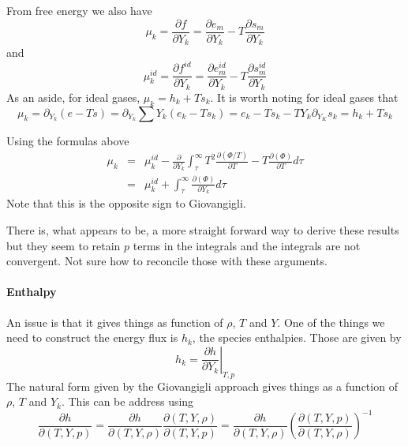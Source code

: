 \documentclass[11pt]{article}
\begin{document}
From free energy we also have
\[
\mu_k = \frac{\partial f}{\partial Y_k} = 
 \frac{\partial e_m}{\partial Y_k} - 
 T\frac{\partial s_m}{\partial Y_k} 
\]
and
\[
\mu_k^{id} = \frac{\partial f^{id}}{\partial Y_k} = 
 \frac{\partial e_m^{id}}{\partial Y_k} - 
 T\frac{\partial s_m^{id}}{\partial Y_k} 
\]
As an aside, for ideal gases, $\mu_k = h_k + T s_k$.  It is worth noting for ideal gases 
that
\[
\mu_k = \partial_{Y_k} (e - T s) = 
 \partial_{Y_k} \sum Y_k(e_k - T s_k) = e_k - T s_k - T Y_k \partial_{Y_K}s_k = h_k + T s_k
\]

Using the formulas above
\begin{eqnarray}
\mu_k &=& \mu_k^{id} - \frac{\partial}{\partial Y_k} \int_\tau^\infty
 T^2 \frac{\partial (\Phi/T)} {\partial T} - T \frac{\partial (\Phi)} {\partial T} d\tau \\
 &=& \mu_k^{id} + \int_\tau^\infty \frac{\partial (\Phi)} {\partial Y_k} d\tau
\end{eqnarray}
Note that this is the opposite sign to Giovangigli.

There is, what appears to be, a more straight forward way to derive these results
but they seem to retain $p$ terms in the integrals
and the integrals are not convergent. Not sure how to reconcile those with these arguments.

%
%
%
\paragraph{Enthalpy}
An issue is that it gives things as function of $\rho$, $T$ and $Y$.  One of the
things we need to construct the energy flux is $h_k$, the species enthalpies.
Those are given by 
\[
h_k = \left. \frac{\partial h}{\partial Y_k} \right|_{T,p}
\]
The natural form given by the Giovangigli approach gives things as a function of $\rho$, $T$ and $Y_k$.
This can be address using
\[
\frac{\partial h}{\partial (T,Y,p)}
= \frac{\partial h}{\partial (T,Y,\rho)}
\frac{\partial (T,Y,\rho)}{\partial (T,Y,p)}
= \frac{\partial h}{\partial (T,Y,\rho)}
\left (\frac{\partial (T,Y,p)}{\partial (T,Y,\rho)} \right)^{-1}
\]
\end{document}
